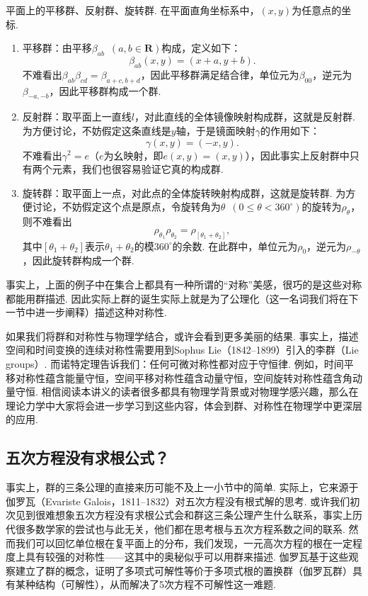 \begin{example}
    平面上的平移群、反射群、旋转群. 在平面直角坐标系中，$(x,y)$为任意点的坐标.
    \begin{enumerate}
        \item 平移群：由平移$\beta_{ab}\enspace(a,b\in\mathbf{R})$构成，定义如下：
              \[\beta_{ab}(x,y)=(x+a,y+b).\]
              不难看出$\beta_{ab}\beta_{cd}=\beta_{a+c,b+d}$，因此平移群满足结合律，单位元为$\beta_{00}$，逆元为$\beta_{-a,-b}$，因此平移群构成一个群.

        \item 反射群：取平面上一直线$l$，对此直线的全体镜像映射构成群，这就是反射群. 为方便讨论，不妨假定这条直线是$y$轴，于是镜面映射$\gamma$的作用如下：
              \[\gamma(x,y)=(-x,y).\]
              不难看出$\gamma^2=e$（$e$为幺映射，即$e(x,y)=(x,y)$），因此事实上反射群中只有两个元素，我们也很容易验证它真的构成群.

        \item 旋转群：取平面上一点，对此点的全体旋转映射构成群，这就是旋转群. 为方便讨论，不妨假定这个点是原点，令旋转角为$\theta\enspace(0\leqslant\theta<360^\circ)$的旋转为$\rho_\theta$，则不难看出
              \[\rho_{\theta_1}\rho_{\theta_2}=\rho_{[\theta_1+\theta_2]},\]
              其中$[\theta_1+\theta_2]$表示$\theta_1+\theta_2$的模$360^\circ$的余数. 在此群中，单位元为$\rho_0$，逆元为$\rho_{-\theta}$，因此旋转群构成一个群.
    \end{enumerate}
\end{example}

事实上，上面的例子中在集合上都具有一种所谓的``对称''美感，很巧的是这些对称都能用群描述. 因此实际上群的诞生实际上就是为了公理化（这一名词我们将在下一节中进一步阐释）描述这种对称性.

如果我们将群和对称性与物理学结合，或许会看到更多美丽的结果. 事实上，描述空间和时间变换的连续对称性需要用到Sophus Lie（1842--1899）引入的李群（Lie groups）. 而诺特定理告诉我们：任何可微对称性都对应于守恒律. 例如，时间平移对称性蕴含能量守恒，空间平移对称性蕴含动量守恒，空间旋转对称性蕴含角动量守恒. 相信阅读本讲义的读者很多都具有物理学背景或对物理学感兴趣，那么在理论力学中大家将会进一步学习到这些内容，体会到群、对称性在物理学中更深层的应用.

\subsection{五次方程没有求根公式？}
事实上，群的三条公理的直接来历可能不及上一小节中的简单. 实际上，它来源于伽罗瓦（Evariste Galois，1811--1832）对五次方程没有根式解的思考. 或许我们初次见到很难想象五次方程没有求根公式会和群这三条公理产生什么联系，事实上历代很多数学家的尝试也与此无关，他们都在思考根与五次方程系数之间的联系. 然而我们可以回忆单位根在复平面上的分布，我们发现，一元高次方程的根在一定程度上具有较强的对称性——这其中的奥秘似乎可以用群来描述. 伽罗瓦基于这些观察建立了群的概念，证明了多项式可解性等价于多项式根的置换群（伽罗瓦群）具有某种结构（可解性），从而解决了5次方程不可解性这一难题.

